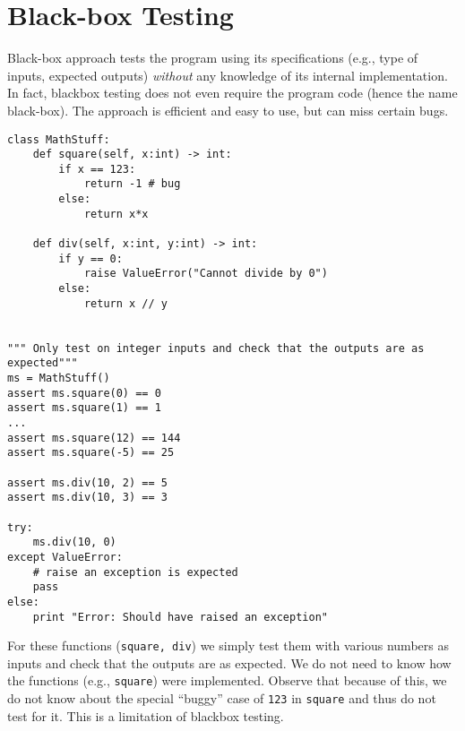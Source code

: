 \documentclass[oneside,11pt,dvipsnames]{book}
\newcommand{\code}[1]{\texttt{#1}}
\begin{document}

\section{Black-box Testing}\label{sec:blackbox}

Black-box approach tests the program using its specifications (e.g., type of inputs, expected outputs) \emph{without} any knowledge of its internal implementation. In fact, blackbox testing does not even require the program code (hence the name black-box).  The approach is efficient and easy to use, but can miss certain bugs.

\begin{lstlisting}
class MathStuff:
    def square(self, x:int) -> int:
        if x == 123:
            return -1 # bug
        else:
            return x*x
    
    def div(self, x:int, y:int) -> int:
        if y == 0:
            raise ValueError("Cannot divide by 0")
        else:
            return x // y


""" Only test on integer inputs and check that the outputs are as expected"""
ms = MathStuff()
assert ms.square(0) == 0   
assert ms.square(1) == 1
...
assert ms.square(12) == 144
assert ms.square(-5) == 25

assert ms.div(10, 2) == 5
assert ms.div(10, 3) == 3

try:
    ms.div(10, 0)
except ValueError:
    # raise an exception is expected
    pass
else:
    print "Error: Should have raised an exception"

\end{lstlisting}

For these functions (\code{square, div}) we simply test them with various numbers as inputs and check that the outputs are as expected. We do not need to know how the functions (e.g., \code{square}) were implemented. Observe that because of this, we do not know about the special ``buggy'' case of \code{123} in \code{square} and thus do not test for it. This is a limitation of blackbox testing.
\end{document}
